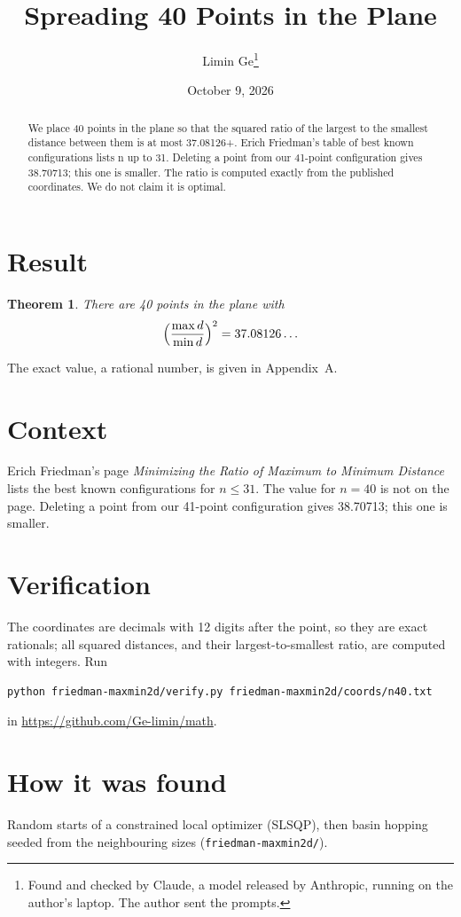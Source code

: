 \documentclass[11pt,a4paper]{article}
\title{Spreading 40 Points in the Plane}
\author{Limin Ge\thanks{Found and checked by Claude, a model released by Anthropic, running on the author's laptop. The author sent the prompts.}}
\date{October 9, 2026}
\newtheorem*{theorem}{Theorem}
\begin{document}
\maketitle
\begin{abstract}
We place 40 points in the plane so that the squared ratio of the largest to the smallest distance between them is at most 37.08126+. Erich Friedman's table of best known configurations lists n up to 31. Deleting a point from our 41-point configuration gives 38.70713; this one is smaller. The ratio is computed exactly from the published coordinates. We do not claim it is optimal.
\end{abstract}

\section{Result}
\begin{theorem}
There are 40 points in the plane with
\[ \Bigl(\frac{\max d}{\min d}\Bigr)^2 = 37.08126\ldots \]
\end{theorem}
The exact value, a rational number, is given in Appendix~A.


\section{Context}
Erich Friedman's page \emph{Minimizing the Ratio of Maximum to Minimum Distance} lists the best known configurations for $n\le 31$. The value for $n=40$ is not on the page. Deleting a point from our 41-point configuration gives 38.70713; this one is smaller.


\section{Verification}
The coordinates are decimals with 12 digits after the point, so they are exact rationals; all squared distances, and their largest-to-smallest ratio, are computed with integers. Run
\begin{verbatim}
python friedman-maxmin2d/verify.py friedman-maxmin2d/coords/n40.txt
\end{verbatim}
in \url{https://github.com/Ge-limin/math}.


\section{How it was found}
Random starts of a constrained local optimizer (SLSQP), then basin hopping seeded from the neighbouring sizes (\texttt{friedman-maxmin2d/}).
\end{document}
